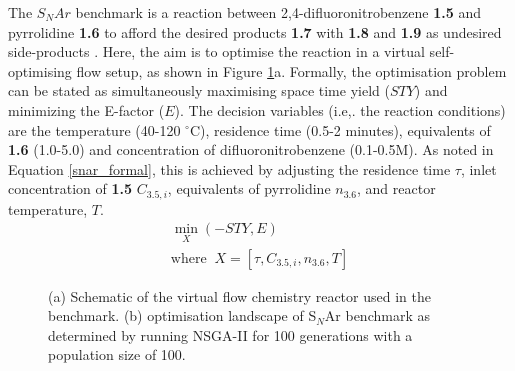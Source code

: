 The $S_NAr$ benchmark is a reaction between 2,4-difluoronitrobenzene \textbf{1.5} and pyrrolidine \textbf{1.6} to afford the desired products \textbf{1.7} with \textbf{1.8} and \textbf{1.9} as undesired side-products \cite{Hone2017}. Here, the aim is to optimise the reaction in a virtual self-optimising flow setup, as shown in Figure \ref{fig:snar}a. Formally, the optimisation problem can be stated as simultaneously maximising space time yield ($STY$) and minimizing the E-factor ($E$). The decision variables (i.e,. the reaction conditions) are the temperature (40-120 $^{\circ}$C), residence time (0.5-2 minutes), equivalents of \textbf{1.6} (1.0-5.0) and concentration of difluoronitrobenzene (0.1-0.5M). As noted in Equation \ref{snar_formal}, this is achieved by adjusting the residence time $\tau$, inlet concentration of \textbf{1.5} $C_{3.5,i}$, equivalents of pyrrolidine $n_{3.6}$, and reactor temperature, $T$.
\begin{equation}
	\label{snar_formal}
	\begin{gathered}
		\min_{X}{(-STY, E)} \\
		\text{where}\;\; X = [\tau,C_{3.5,i},n_{3.6}, T]
	\end{gathered}
\end{equation}


\begin{figure}
    \centering
    \caption{(a) Schematic of the virtual flow chemistry reactor used in the benchmark. (b) optimisation landscape of S$_N$Ar benchmark as determined by running NSGA-II for 100 generations with a population size of 100.}
    \label{fig:snar}

\end{figure}

